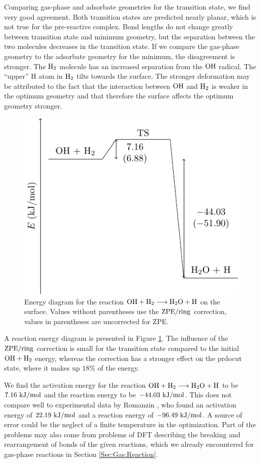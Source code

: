 Comparing gas-phase and adsorbate geometries for the transition state, we find
very good agreement. Both transition states are predicted nearly planar,
which is not true for the pre-reactive complex. Bond lengths do not change
greatly between transition state and minimum geometry, but the separation
between the two molecules decreases in the transition state. If we compare the gas-phase
geometry to the adsorbate geometry for the minimum, the disagreement is
stronger. The $\text H_2$ molecule has an increased separation from the $\text O \text H$
radical. The ``upper'' H atom in $\text H_2$ tilts towards the surface. The stronger
deformation may be attributed to the fact that the interaction between $\text O \text H$ and
$\text H_2$ is weaker in the optimum geometry and that therefore the surface affects
the optimum geometry stronger. 

\begin{figure}[t]
\centering
\includegraphics[width=.8\textwidth]{TikzPics/TikzCreation/HO.H2.Activation/HOH2Activation.pdf}
\caption{Energy diagram for the reaction $\text O \text H + \text H_2 \longrightarrow \text H _2 \text O + \text H$ on
the surface. Values without parentheses use the $\text{ZPE}/\text{ring}$ correction, values in
parentheses are uncorrected for ZPE.}
\label{Fig:Adv:ReactionEnergyDiagram}
\end{figure}

A reaction energy diagram is presented in Figure
\ref{Fig:Adv:ReactionEnergyDiagram}. The influence of the
$\text{ZPE}/\text{ring}$ correction is small for the transition state compared to the initial
$\text O \text H + \text H_2$ energy, whereas the correction has a stronger effect on the prdocut
state, where it makes up $18\%$ of the energy.

We find the activation energy for the reaction \mbox{$\text O \text H + \text H_2 \longrightarrow \text H _2 \text O +
\text H$} to be $7.16~\text {kJ/mol}$ and the reaction energy to be $-44.03~\text {kJ/mol}$. This does
not compare well to experimental data by Romanzin
\etal,\cite{RomanzinIoppoloCuppenEtAl2011} who found an activation energy of
$22.19~\text {kJ/mol}$ and a reaction energy of $-96.49~\text {kJ/mol}$. A source of error could be
the neglect of a finite temperature in the optimization. Part of the problems
may also come from problems of DFT describing the breaking and rearrangement of
bonds of the given reactions, which we already encountered for gas-phase
reactions in Section \ref{Sec:Gas:Reaction}.


